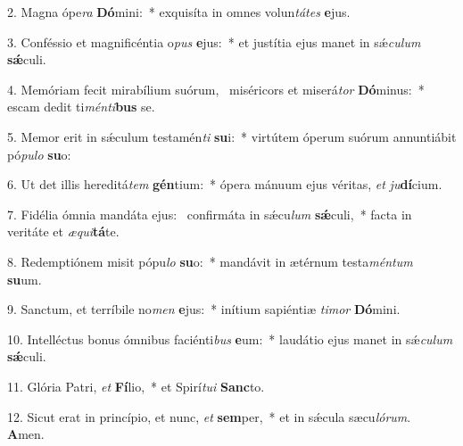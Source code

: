 2. Magna ópe\textit{ra} \textbf{Dó}mini:~*  exquisíta in omnes volun\textit{tá}\textit{tes} \textbf{e}jus.\

3. Conféssio et magnificéntia o\textit{pus} \textbf{e}jus:~*  et justítia ejus manet in sǽ\textit{cu}\textit{lum} \textbf{sǽ}culi.\

4. Memóriam fecit mirabílium suórum, \dag\  miséricors et miserá\textit{tor} \textbf{Dó}minus:~*  escam dedit ti\textit{mén}\textit{ti}\textbf{bus} se.\

5. Memor erit in sǽculum testamén\textit{ti} \textbf{su}i:~*  virtútem óperum suórum annuntiábit pó\textit{pu}\textit{lo} \textbf{su}o:\

6. Ut det illis hereditá\textit{tem} \textbf{gén}tium:~*  ópera mánuum ejus véritas, \textit{et} \textit{ju}\textbf{dí}cium.\

7. Fidélia ómnia mandáta ejus: \dag\  confirmáta in sǽcu\textit{lum} \textbf{sǽ}culi,~*  facta in veritáte et \textit{æ}\textit{qui}\textbf{tá}te.\

8. Redemptiónem misit pópu\textit{lo} \textbf{su}o:~*  mandávit in ætérnum testa\textit{mén}\textit{tum} \textbf{su}um.\

9. Sanctum, et terríbile no\textit{men} \textbf{e}jus:~*  inítium sapiéntiæ \textit{ti}\textit{mor} \textbf{Dó}mini.\

10. Intelléctus bonus ómnibus faciénti\textit{bus} \textbf{e}um:~*  laudátio ejus manet in sǽ\textit{cu}\textit{lum} \textbf{sǽ}culi.\

11. Glória Patri, \textit{et} \textbf{Fí}lio,~*  et Spirí\textit{tu}\textit{i} \textbf{Sanc}to.\

12. Sicut erat in princípio, et nunc, \textit{et} \textbf{sem}per,~*  et in sǽcula sæcu\textit{ló}\textit{rum}. \textbf{A}men.\

